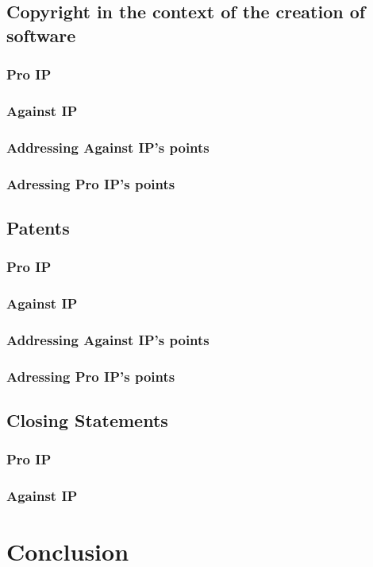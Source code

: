 \documentclass[a4paper]{report}
\begin{document}
\section{Copyright in the context of the creation of software}
\label{sec:CopySoft}

\subsection{Pro IP}

\subsection{Against IP}

\subsection{Addressing Against IP's points}

\subsection{Adressing Pro IP's points}

\section{Patents}
\label{sec:DiscPatents}

\subsection{Pro IP}

\subsection{Against IP}

\subsection{Addressing Against IP's points}

\subsection{Adressing Pro IP's points}

\section{Closing Statements}
\label{sec:ClosStat}

\subsection{Pro IP}

\subsection{Against IP}

\chapter{Conclusion}
\label{ch:Concl}

\newpage

\printbibliography
\end{document}
